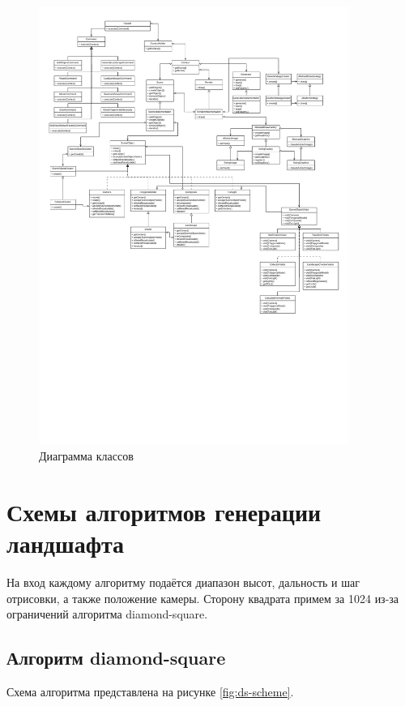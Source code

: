 \begin{figure}[h!]
	\centering
	\includegraphics[width=0.9\textwidth]{tex_parts/diagram.pdf}
	\caption{\label{fig:classes}Диаграмма классов}
\end{figure}


\section{Схемы алгоритмов генерации ландшафта}

На вход каждому алгоритму подаётся диапазон высот, дальность и шаг отрисовки, а также положение камеры. Сторону квадрата примем за 1024 из-за ограничений алгоритма diamond-square. 

\subsection{Алгоритм diamond-square}

Схема алгоритма представлена на рисунке \ref{fig:ds-scheme}. 


